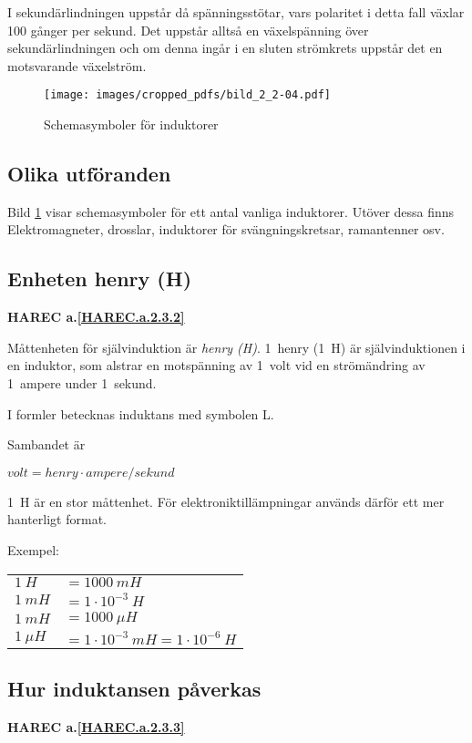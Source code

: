 I sekundärlindningen uppstår då spänningsstötar, vars polaritet i detta fall
växlar 100 gånger per sekund. Det uppstår alltså en växelspänning över
sekundärlindningen och om denna ingår i en sluten strömkrets uppstår det en
motsvarande växelström.


\begin{figure}
\texttt{[image: images/cropped\_pdfs/bild\_2\_2-04.pdf]}
\caption{Schemasymboler för induktorer}
\label{fig:BildII2-4}
\end{figure}

\subsection{Olika utföranden}

Bild \ref{fig:BildII2-4} visar schemasymboler för ett antal vanliga induktorer.
Utöver dessa finns Elektromagneter, drosslar, induktorer för svängningskretsar,
ramantenner osv.

\subsection{Enheten henry (H)}
\textbf{HAREC a.\ref{HAREC.a.2.3.2}\label{myHAREC.a.2.3.2}}

Måttenheten för självinduktion är \emph{henry (H)}.
1~henry (1~H) är självinduktionen i en induktor, som alstrar en motspänning av
1~volt vid en strömändring av 1~ampere under 1~sekund.

I formler betecknas induktans med symbolen L.

Sambandet är

\(volt = henry \cdot ampere/sekund\)

1~H är en stor måttenhet. För elektroniktillämpningar används därför ett mer
hanterligt format.

Exempel:

\begin{tabular}{ll}
\(1\ H \) & \(= 1000\ mH\) \\
\(1\ mH\) & \(= 1 \cdot 10^{-3}\ H\) \\
\(1\ mH\) & \(= 1000\ \mu H\) \\
\(1\ \mu H\) & \(= 1 \cdot 10^{-3}\ mH = 1 \cdot 10^{-6}\ H \)
\end{tabular}

\subsection{Hur induktansen påverkas}
\textbf{HAREC a.\ref{HAREC.a.2.3.3}\label{myHAREC.a.2.3.3}}

